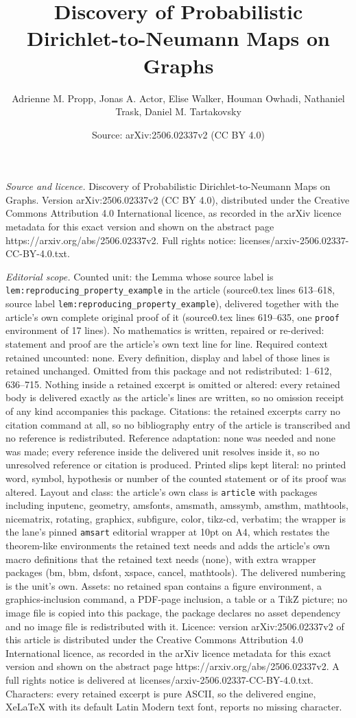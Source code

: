 \documentclass[10pt,a4paper]{amsart}
\title[Discovery of Probabilistic Dirichlet-to-Neumann Maps on Grap]{Discovery of Probabilistic Dirichlet-to-Neumann Maps on Graphs}
\author{Adrienne M. Propp, Jonas A. Actor, Elise Walker, Houman Owhadi, Nathaniel Trask, Daniel M. Tartakovsky}
\date{Source: arXiv:2506.02337v2 (CC BY 4.0)}
\begin{document}
\maketitle

\noindent\emph{Source and licence.} Discovery of Probabilistic Dirichlet-to-Neumann Maps on Graphs. Version arXiv:2506.02337v2 (CC BY 4.0), distributed under the Creative Commons Attribution 4.0 International licence, as recorded in the arXiv licence metadata for this exact version and shown on the abstract page https://arxiv.org/abs/2506.02337v2. Full rights notice: licenses/arxiv-2506.02337-CC-BY-4.0.txt.\par\smallskip

\noindent\textit{Editorial scope.} Counted unit: the Lemma whose source label is \texttt{lem:reproducing\_property\_example} in the article (source0.tex lines 613--618, source label \texttt{lem:reproducing\_property\_example}), delivered together with the article's own complete original proof of it (source0.tex lines 619--635, one \texttt{proof} environment of 17 lines). No mathematics is written, repaired or re-derived: statement and proof are the article's own text line for line. Required context retained uncounted: none. Every definition, display and label of those lines is retained unchanged. Omitted from this package and not redistributed: 1--612, 636--715. Nothing inside a retained excerpt is omitted or altered: every retained body is delivered exactly as the article's lines are written, so no omission receipt of any kind accompanies this package. Citations: the retained excerpts carry no citation command at all, so no bibliography entry of the article is transcribed and no reference is redistributed. Reference adaptation: none was needed and none was made; every reference inside the delivered unit resolves inside it, so no unresolved reference or citation is produced. Printed slips kept literal: no printed word, symbol, hypothesis or number of the counted statement or of its proof was altered. Layout and class: the article's own class is \texttt{article} with packages including inputenc, geometry, amsfonts, amsmath, amssymb, amsthm, mathtools, nicematrix, rotating, graphicx, subfigure, color, tikz-cd, verbatim; the wrapper is the lane's pinned \texttt{amsart} editorial wrapper at 10pt on A4, which restates the theorem-like environments the retained text needs and adds the article's own macro definitions that the retained text needs (none), with extra wrapper packages (bm, bbm, dsfont, xspace, cancel, mathtools). The delivered numbering is the unit's own. Assets: no retained span contains a figure environment, a graphics-inclusion command, a PDF-page inclusion, a table or a TikZ picture; no image file is copied into this package, the package declares no asset dependency and no image file is redistributed with it. Licence: version arXiv:2506.02337v2 of this article is distributed under the Creative Commons Attribution 4.0 International licence, as recorded in the arXiv licence metadata for this exact version and shown on the abstract page https://arxiv.org/abs/2506.02337v2. A full rights notice is delivered at licenses/arxiv-2506.02337-CC-BY-4.0.txt. Characters: every retained excerpt is pure ASCII, so the delivered engine, XeLaTeX with its default Latin Modern text font, reports no missing character.
\end{document}
